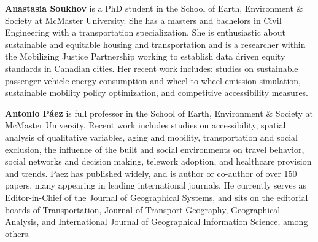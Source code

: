 \documentclass[Royal,times,sageh]{sagej}
\begin{document}
\textbf{Anastasia Soukhov} is a PhD student in the School of Earth,
Environment \& Society at McMaster University. She has a masters and
bachelors in Civil Engineering with a transportation specialization. She
is enthusiastic about sustainable and equitable housing and
transportation and is a researcher within the Mobilizing Justice
Partnership working to establish data driven equity standards in
Canadian cities. Her recent work includes: studies on sustainable
passenger vehicle energy consumption and wheel-to-wheel emission
simulation, sustainable mobility policy optimization, and competitive
accessibility measures.

\textbf{Antonio Páez} is full professor in the School of Earth,
Environment \& Society at McMaster University. Recent work includes
studies on accessibility, spatial analysis of qualitative variables,
aging and mobility, transportation and social exclusion, the influence
of the built and social environments on travel behavior, social networks
and decision making, telework adoption, and healthcare provision and
trends. Paez has published widely, and is author or co-author of over
150 papers, many appearing in leading international journals. He
currently serves as Editor-in-Chief of the Journal of Geographical
Systems, and sits on the editorial boards of Transportation, Journal of
Transport Geography, Geographical Analysis, and International Journal of
Geographical Information Science, among others.
\end{document}
